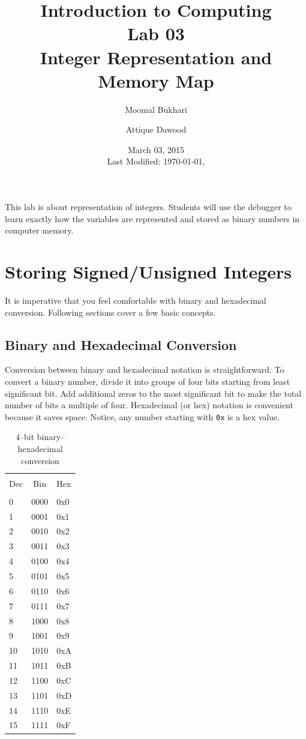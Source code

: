 \documentclass[12pt,a4paper]{article}
\title{Introduction to Computing\\Lab 03\\Integer Representation and Memory Map}
\author{Moomal Bukhari\and Attique Dawood}
\date{March 03, 2015\\[0.2cm] Last Modified: \today, \currenttime}
\begin{document}
\maketitle
This lab is about representation of integers. Students will use the debugger to learn exactly how the variables are represented and stored as binary numbers in computer memory\footnotemark.


\section{Storing Signed/Unsigned Integers}
It is imperative that you feel comfortable with binary and hexadecimal conversion. Following sections cover a few basic concepts.

\subsection{Binary and Hexadecimal Conversion}
Conversion between binary and hexadecimal notation is straightforward. To convert a binary number, divide it into groups of four bits starting from least significant bit. Add additional zeros to the most significant bit to make the total number of bits a multiple of four. Hexadecimal (or hex) notation is convenient because it saves space. Notice, any number starting with \verb|0x| is a hex value.

\begin{table}[H]
\centering
\label{4-bit-bin-hex-table}
	\begin{tabular}{l c l}
	\hline \hline \\ [-2ex]
	Dec & Bin & Hex\\
	\hline \\ [-2ex]
	0  & 0000 & 0x0\\
	1  & 0001 & 0x1\\
	2  & 0010 & 0x2\\
	3  & 0011 & 0x3\\
	4  & 0100 & 0x4\\
	5  & 0101 & 0x5\\
	6  & 0110 & 0x6\\
	7  & 0111 & 0x7\\
	8  & 1000 & 0x8\\
	9  & 1001 & 0x9\\
	10 & 1010 & 0xA\\
	11 & 1011 & 0xB\\
	12 & 1100 & 0xC\\
	13 & 1101 & 0xD\\
	14 & 1110 & 0xE\\
	15 & 1111 & 0xF\\
	\hline \hline
	\end{tabular}
\caption{4--bit binary--hexadecimal conversion}
\end{table}
\end{document}

